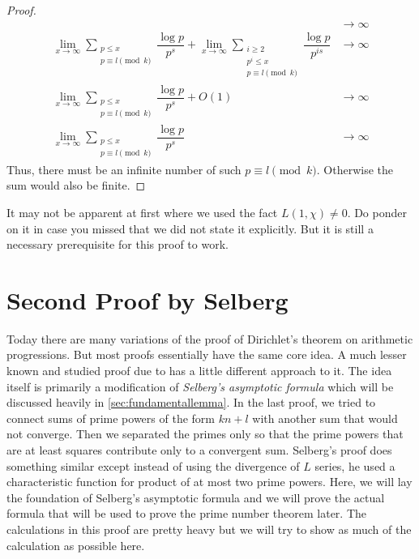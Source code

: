 \documentclass[elemannt.tex]{subfile}
\begin{document}
\begin{proof}
\begin{align*}
						& \to\infty\\
					\lim_{x\to\infty}\sum_{\substack{p\leq x\\p\equiv l\pmod{k}}}\dfrac{\log{p}}{p^{s}}+\lim_{x\to\infty}\sum_{\substack{i\geq 2\\p^{i}\leq x\\p\equiv l\pmod{k}}}\dfrac{\log{p}}{p^{is}}
						& \to\infty\\
					\lim_{x\to\infty}\sum_{\substack{p\leq x\\p\equiv l\pmod{k}}}\dfrac{\log{p}}{p^{s}}+O(1)
						& \to\infty\\
					\lim_{x\to\infty}\sum_{\substack{p\leq x\\p\equiv l\pmod{k}}}\dfrac{\log{p}}{p^{s}}
						& \to\infty
				\end{align*}
			Thus, there must be an infinite number of such $p\equiv l\pmod{k}$. Otherwise the sum would also be finite.
		\end{proof}

		\begin{note}
			It may not be apparent at first where we used the fact $L(1, \chi)\neq0$. Do ponder on it in case you missed that we did not state it explicitly. But it is still a necessary prerequisite for this proof to work.
		\end{note}
	\section{Second Proof by Selberg}
	Today there are many variations of the proof of Dirichlet's theorem on arithmetic progressions. But most proofs essentially have the same core idea. A much lesser known and studied proof due to \textcite{selberg_1949} has a little different approach to it. The idea itself is primarily a modification of \textit{Selberg's asymptotic formula} which will be discussed heavily in \autoref{sec:fundamentallemma}. In the last proof, we tried to connect sums of prime powers of the form $kn+l$ with another sum that would not converge. Then we separated the primes only so that the prime powers that are at least squares contribute only to a convergent sum. Selberg's proof does something similar except instead of using the divergence of $L$ series, he used a characteristic function for product of at most two prime powers. Here, we will lay the foundation of Selberg's asymptotic formula and we will prove the actual formula that will be used to prove the prime number theorem later. The calculations in this proof are pretty heavy but we will try to show as much of the calculation as possible here.
\end{document}
